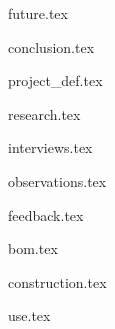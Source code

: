 \documentclass{book}
\begin{document}
{future.tex}

{conclusion.tex}

\appendix

{project_def.tex}

{research.tex}

{interviews.tex}

{observations.tex}

{feedback.tex}

{bom.tex}

{construction.tex}

{use.tex}

\backmatter
\end{document}
